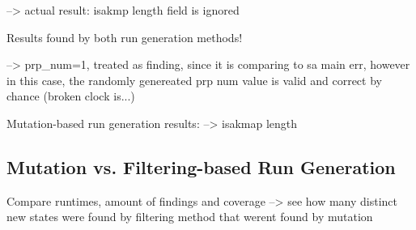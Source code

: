 --> actual result: isakmp length field is ignored

Results found by both run generation methods!

--> prp\_num=1, treated as finding, since it is comparing to sa main err, however in this case, the randomly genereated prp num value is valid and correct by chance (broken clock is...)

Mutation-based run generation results:
--> isakmap length


\subsection{Mutation vs. Filtering-based Run Generation} \label{subsec:mutation_vs_finltering}
Compare runtimes, amount of findings and coverage --> see how many distinct new states were found by filtering method that werent found by mutation

